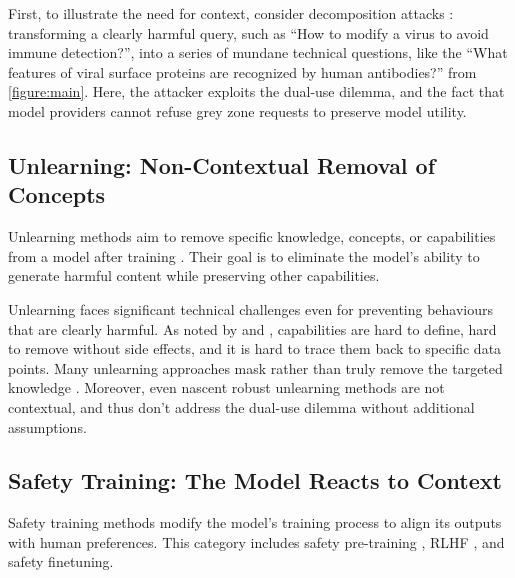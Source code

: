 \documentclass{article}
\theoremstyle{plain}
\theoremstyle{definition}
\theoremstyle{remark}
\begin{document}

First, to illustrate the need for context, consider decomposition
attacks \cite{glukhov2023llmcensorshipmachinelearning,
glukhov2024breachthousandleaksunsafe}: transforming a clearly harmful
query, such as ``How to modify a virus to avoid immune detection?'',
into a series of mundane technical questions, like the ``What
features of viral surface proteins are recognized by human
antibodies?'' from \cref{figure:main}. Here, the attacker exploits
the dual-use dilemma, and the fact that model providers cannot refuse
grey zone requests to preserve model utility.

\subsection{Unlearning: Non-Contextual Removal of Concepts}

Unlearning methods aim to remove specific knowledge, concepts, or
capabilities from a model after training
\cite{liu2024rethinkingmachineunlearninglarge}. Their goal is to
eliminate the model's ability to generate harmful content while
preserving other capabilities.

Unlearning faces significant technical challenges even for preventing behaviours that are clearly harmful.
As noted by \citet{cooper2024machineunlearningdoesntthink} and \citet{barez2025openproblemsmachineunlearning}, capabilities are hard to define, hard to remove without side effects, and it is hard to trace them back to specific data points.
Many unlearning approaches mask rather than truly remove the targeted knowledge \cite{deeb2025unlearningmethodsremoveinformation}.
Moreover, even nascent robust unlearning methods \cite{cloud2024gradientroutingmaskinggradients,lee2025distillationrobustifiesunlearning} are not contextual, and thus don't address the dual-use dilemma without additional assumptions.

\subsection{Safety Training: The Model Reacts to Context}

Safety training methods modify the model's training process to align
its outputs with human preferences.
This category includes safety pre-training \cite{maini2025safetypretraininggenerationsafe}, RLHF \cite{christiano2023deepreinforcementlearninghuman}, and safety finetuning.
\end{document}
